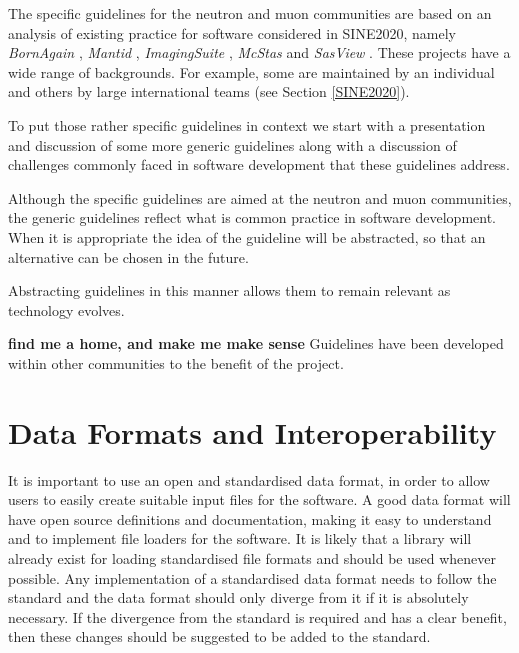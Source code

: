 \documentclass[jnr]{iosart2x}
\newcommand{\todo}[1]{\textbf{#1}}
\begin{document}
The specific guidelines for the neutron and muon communities are based on an analysis of existing practice for software considered in SINE2020, namely {\it BornAgain} \cite{bornagain}, {\it Mantid} \cite{mantid}, {\it ImagingSuite} \cite{ImagingSuite}, {\it McStas} \cite{mcstas} and {\it SasView} \cite{sasview}.
These projects have a wide range of backgrounds.
For example, some are maintained by an individual and others by large international teams (see Section \ref{SINE2020}).

To put those rather specific guidelines in context we start with a presentation and discussion of some more generic guidelines along with a discussion of challenges commonly faced in software development that these guidelines address.

Although the specific guidelines are aimed at the neutron and muon communities, the generic guidelines reflect what is common practice in software development.
When it is appropriate the idea of the guideline will be abstracted, so that an alternative can be chosen in the future.

Abstracting guidelines in this manner allows them to remain relevant as technology evolves.

\todo{find me a home, and make me make sense}
Guidelines have been developed within other communities to the benefit of the project.

\section{Data Formats and Interoperability}
\label{Data Formats and Interoperability}

It is important to use an open and standardised data format, in order to allow users to easily create suitable input files for the software.
A good data format will have open source definitions and documentation, making it easy to understand and to implement file loaders for the software.
It is likely that a library will already exist for loading standardised file formats and should be used whenever possible.
Any implementation of a standardised data format needs to follow the standard and
the data format should only diverge from it if it is absolutely necessary.
If the divergence from the standard is required and has a clear benefit, then these changes should be suggested to be added to the standard.
\end{document}
